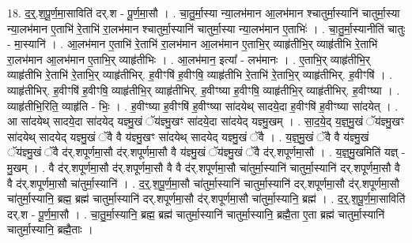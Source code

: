 \documentclass[17pt]{extarticle}
\begin{document}
18. द॒र्॒.श॒पू॒र्ण॒मा॒साविति॑ दर्.श - पू॒र्ण॒मा॒सौ । . चा॒तु॒र्मा॒स्या न्या॒लभ॑मान आ॒लभ॑मान श्चातुर्मा॒स्यानि॑ चातुर्मा॒स्या न्या॒लभ॑मान ए॒ताभि॑ रे॒ताभि॑ रा॒लभ॑मान श्चातुर्मा॒स्यानि॑ चातुर्मा॒स्या न्या॒लभ॑मान ए॒ताभिः॑ । . चा॒तु॒र्मा॒स्यानीति॑ चातुः - मा॒स्यानि॑ । . आ॒लभ॑मान ए॒ताभि॑ रे॒ताभि॑ रा॒लभ॑मान आ॒लभ॑मान ए॒ताभि॒र् व्याहृ॑तीभि॒र् व्याहृ॑तीभि रे॒ताभि॑ रा॒लभ॑मान आ॒लभ॑मान ए॒ताभि॒र् व्याहृ॑तीभिः । . आ॒लभ॑मान॒ इत्या᳚ - लभ॑मानः । . ए॒ताभि॒र् व्याहृ॑तीभि॒र् व्याहृ॑तीभि रे॒ताभि॑ रे॒ताभि॒र् व्याहृ॑तीभिर्. ह॒वीꣳषि॑ ह॒वीꣳषि॒ व्याहृ॑तीभि रे॒ताभि॑ रे॒ताभि॒र् व्याहृ॑तीभिर्. ह॒वीꣳषि॑ । . व्याहृ॑तीभिर्. ह॒वीꣳषि॑ ह॒वीꣳषि॒ व्याहृ॑तीभि॒र् व्याहृ॑तीभिर्. ह॒वीꣳष्या ह॒वीꣳषि॒ व्याहृ॑तीभि॒र् व्याहृ॑तीभिर्. ह॒वीꣳष्या । . व्याहृ॑तीभि॒रिति॒ व्याहृ॑ति - भिः॒ । . ह॒वीꣳष्या ह॒वीꣳषि॑ ह॒वीꣳष्या सा॑दयेथ् सादये॒दा ह॒वीꣳषि॑ ह॒वीꣳष्या सा॑दयेत् । . आ सा॑दयेथ् सादये॒दा सा॑दयेद् यज्ञ्मु॒खं ॅय॑ज्ञ्मु॒खꣳ सा॑दये॒दा सा॑दयेद् यज्ञ्मु॒खम् । . सा॒द॒ये॒द् य॒ज्ञ्॒मु॒खं ॅय॑ज्ञ्मु॒खꣳ सा॑दयेथ् सादयेद् यज्ञ्मु॒खं ॅवै वै य॑ज्ञ्मु॒खꣳ सा॑दयेथ् सादयेद् यज्ञ्मु॒खं ॅवै । . य॒ज्ञ्॒मु॒खं ॅवै वै य॑ज्ञ्मु॒खं ॅय॑ज्ञ्मु॒खं ॅवै द॑र्.शपूर्णमा॒सौ द॑र्.शपूर्णमा॒सौ वै य॑ज्ञ्मु॒खं ॅय॑ज्ञ्मु॒खं ॅवै द॑र्.शपूर्णमा॒सौ । . य॒ज्ञ्॒मु॒खमिति॑ यज्ञ् - मु॒खम् । . वै द॑र्.शपूर्णमा॒सौ द॑र्.शपूर्णमा॒सौ वै वै द॑र्.शपूर्णमा॒सौ चा॑तुर्मा॒स्यानि॑ चातुर्मा॒स्यानि॑ दर्.शपूर्णमा॒सौ वै वै द॑र्.शपूर्णमा॒सौ चा॑तुर्मा॒स्यानि॑ । . द॒र्॒.श॒पू॒र्ण॒मा॒सौ चा॑तुर्मा॒स्यानि॑ चातुर्मा॒स्यानि॑ दर्.शपूर्णमा॒सौ द॑र्.शपूर्णमा॒सौ चा॑तुर्मा॒स्यानि॒ ब्रह्म॒ ब्रह्म॑ चातुर्मा॒स्यानि॑ दर्.शपूर्णमा॒सौ द॑र्.शपूर्णमा॒सौ चा॑तुर्मा॒स्यानि॒ ब्रह्म॑ । . द॒र्॒.श॒पू॒र्ण॒मा॒साविति॑ दर्.श - पू॒र्ण॒मा॒सौ । . चा॒तु॒र्मा॒स्यानि॒ ब्रह्म॒ ब्रह्म॑ चातुर्मा॒स्यानि॑ चातुर्मा॒स्यानि॒ ब्रह्मै॒ता ए॒ता ब्रह्म॑ चातुर्मा॒स्यानि॑ चातुर्मा॒स्यानि॒ ब्रह्मै॒ताः । \newline
\end{document}
